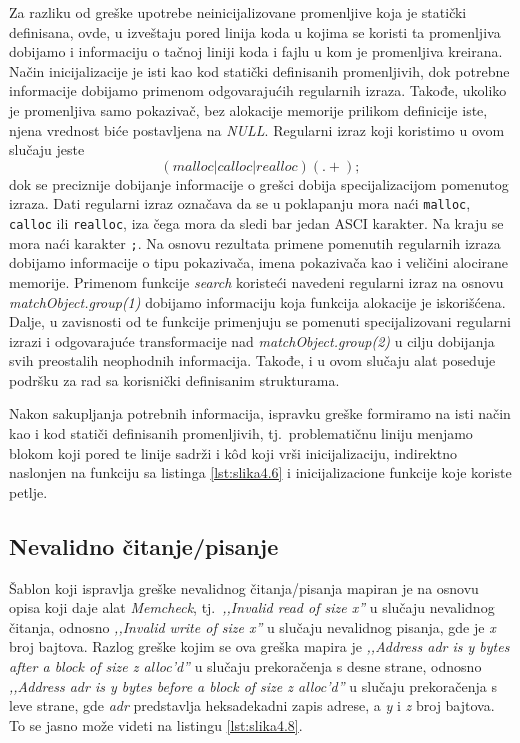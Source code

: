 \documentclass[12pt,oneside]{memoir}
\theoremstyle{plain}
\theoremstyle{definition}
\begin{document}
Za razliku od greške upotrebe neinicijalizovane promenljive koja je statički definisana, ovde, u izveštaju pored linija koda u kojima se koristi ta promenljiva dobijamo i informaciju o tačnoj liniji koda i fajlu u kom je promenljiva kreirana. Način inicijalizacije je isti kao kod statički definisanih promenljivih, dok potrebne informacije dobijamo primenom odgovarajućih regularnih izraza. Takođe, ukoliko je promenljiva samo pokazivač, bez alokacije memorije prilikom definicije iste, njena vrednost biće postavljena na \textit{NULL}. Regularni izraz koji koristimo u ovom slučaju jeste 
$$ (malloc|calloc|realloc)(.+); $$
dok se preciznije dobijanje informacije o grešci dobija specijalizacijom pomenutog izraza. Dati regularni izraz označava da se u poklapanju mora naći \texttt{malloc}, \texttt{calloc} ili \texttt{realloc}, iza čega mora da sledi bar jedan ASCI karakter. Na kraju se mora naći karakter \texttt{;}. Na osnovu rezultata primene pomenutih regularnih izraza dobijamo informacije o tipu pokazivača, imena pokazivača kao i veličini alocirane memorije. Primenom funkcije \textit{search} koristeći navedeni regularni izraz na osnovu \textit{matchObject.group(1)} dobijamo informaciju koja funkcija alokacije je iskorišćena. Dalje, u zavisnosti od te funkcije primenjuju se pomenuti specijalizovani regularni izrazi i odgovarajuće transformacije nad \textit{matchObject.group(2)} u cilju dobijanja svih preostalih neophodnih informacija. Takođe, i u ovom slučaju alat poseduje podršku za rad sa korisnički definisanim strukturama. 

Nakon sakupljanja potrebnih informacija, ispravku greške formiramo na isti način kao i kod statiči definisanih promenljivih, tj.~problematičnu liniju menjamo blokom koji pored te linije sadrži i k\^od koji vrši inicijalizaciju, indirektno naslonjen na funkciju sa listinga \ref{lst:slika4.6} i inicijalizacione funkcije koje koriste petlje.

\subsection{Nevalidno čitanje/pisanje}
Šablon koji ispravlja greške nevalidnog čitanja/pisanja mapiran je na osnovu opisa koji daje alat \textit{Memcheck}, tj.~\textit{,,Invalid read of size x''} u slučaju nevalidnog čitanja, odnosno \textit{,,Invalid write of size x''} u slučaju nevalidnog pisanja, gde je \textit{x} broj bajtova. Razlog greške kojim se ova greška mapira je \textit{,,Address adr is y bytes after a block of size z alloc'd''} u slučaju prekoračenja s desne strane, odnosno \textit{,,Address adr is y bytes before a block of size z alloc'd''} u slučaju prekoračenja s leve strane, gde \textit{adr} predstavlja heksadekadni zapis adrese, a \textit{y} i \textit{z} broj bajtova. To se jasno može videti na listingu \ref{lst:slika4.8}.
\end{document}
